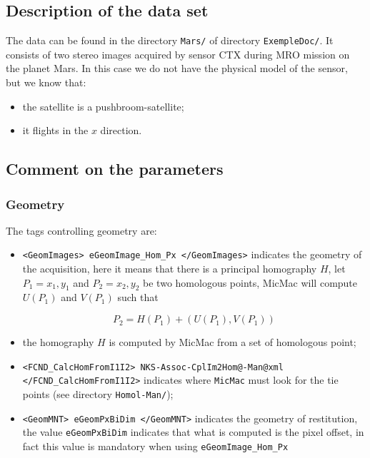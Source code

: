 \subsection{Description of the data set}

The data can be found in the directory {\tt Mars/} of directory {\tt ExempleDoc/}.
It consists of two stereo images acquired by sensor CTX during MRO mission on the planet Mars. In this case
we do not have the physical model of the sensor, but we know that:

\begin{itemize}
   \item the satellite is a  pushbroom-satellite;
   \item it flights in the $x$ direction.
\end{itemize}

\subsection{Comment on the parameters}

\subsubsection{Geometry}

The tags controlling geometry are:

\begin{itemize}

   \item   {\tt <GeomImages> eGeomImage\_Hom\_Px </GeomImages>} indicates the geometry of the acquisition,
          here it means that there is a principal homography $H$, let $P_1=x_1,y_1$ and  $P_2=x_2,y_2$ be two
          homologous points, MicMac will compute $U(P_1)$ and $V(P_1)$ such that

\begin{equation}
    P_2 = H(P_1) + (U(P_1),V(P_1))
\end{equation}

   \item  the homography $H$ is computed by MicMac from a set of homologous point;

   \item  {\tt  <FCND\_CalcHomFromI1I2> NKS-Assoc-CplIm2Hom@-Man@xml  </FCND\_CalcHomFromI1I2>}  indicates
          where {\tt MicMac} must look for the tie points (see directory {\tt Homol-Man/});


   \item  {\tt <GeomMNT> eGeomPxBiDim  </GeomMNT>} indicates the geometry of restitution,
          the value {\tt eGeomPxBiDim} indicates that what is computed is the pixel offset, in fact this value
          is mandatory when using {\tt eGeomImage\_Hom\_Px}


\end{itemize}

